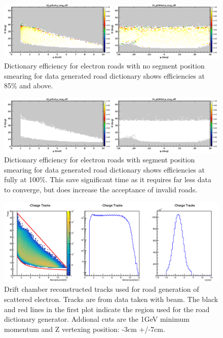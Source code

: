 \begin{figure}[hbt]
	\centering
	\includegraphics[width=1.0\columnwidth,keepaspectratio]{img/dc_neg_data_efficiency_nosmearing.png}
	\caption{Dictionary efficiency for electron roads with no segment position smearing for data generated road dictionary shows efficiencies at 85\% and above.}
	\label{fig:dc_neg_data_efficiency_nosmearing}
\end{figure}

\begin{figure}[hbt]
	\centering
	\includegraphics[width=1.0\columnwidth,keepaspectratio]{img/dc_neg_data_efficiency_smearing.png}
	\caption{Dictionary efficiency for electron roads with segment position smearing for data generated road dictionary shows efficiencies at fully at 100\%. This save significant time as it requires far less data to converge, but does increase the acceptance of invalid roads.}
	\label{fig:dc_neg_data_efficiency_smearing}
\end{figure}

\begin{figure}[hbt]
	\centering
	\includegraphics[width=1.0\columnwidth,keepaspectratio]{img/dc_roads_electrons_data.png}
	\caption{Drift chamber reconstructed tracks used for road generation of scattered electron. Tracks are from data taken with beam. The black and red lines in the first plot indicate the region used for the road dictionary generator. Addional cuts are the 1GeV minimum momentum and Z vertexing position: -3cm +/-7cm.}
	\label{fig:dc_roads_electrons_data}
\end{figure}

